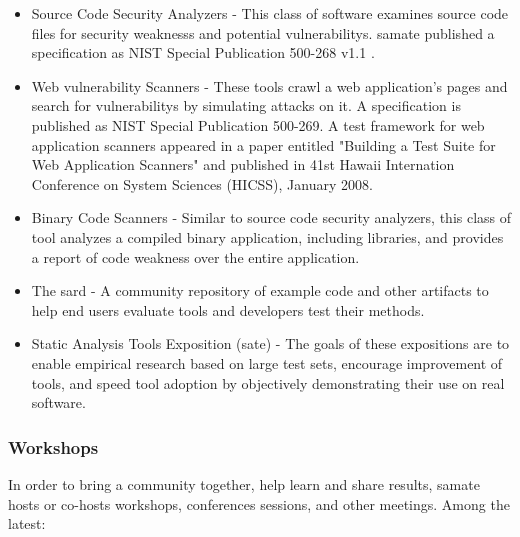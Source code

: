 \begin{itemize}
    \item Source Code Security Analyzers - This class of software examines source code files for security \glspl{weakness} and potential \glspl{vulnerability}. \gls{samate} published a specification as NIST Special Publication 500-268 v1.1 \cite{black2007source}.
    \item Web \Gls{vulnerability} Scanners - These tools crawl a web application's pages and search for \glspl{vulnerability} by simulating attacks on it. A specification is published as NIST Special Publication 500-269. A test framework for web application scanners appeared in a paper entitled "Building a Test Suite for Web Application Scanners" and published in 41st Hawaii Internation Conference on System Sciences (HICSS), January 2008.
    \item Binary Code Scanners - Similar to source code security analyzers, this class of tool analyzes a compiled binary application, including libraries, and provides a report of code \gls{weakness} over the entire application.
    \item The \gls{sard} \cite{nist2016sard} - A community repository of example code and other artifacts to help end users evaluate tools and developers test their methods.
    \item Static Analysis Tools Exposition (\gls{sate}) - The goals of these expositions are to enable empirical research based on large test sets, encourage improvement of tools, and speed tool adoption by objectively demonstrating their use on real software.
\end{itemize}

\subsubsection{Workshops}

In order to bring a community together, help learn and share results, \gls{samate} hosts or co-hosts workshops, conferences sessions, and other meetings. Among the latest:

